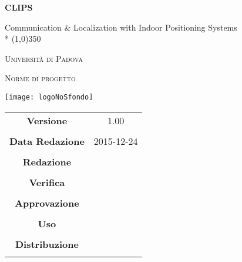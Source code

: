 \documentclass[a4paper,12pt]{article}
\author{Oscar Elia Conti, Marco Zanella}
\date{24/12/2015}
\begin{document}
	\begin{titlepage}
		\centering
		{\huge\bfseries CLIPS\par}
		Communication \& Localization with Indoor Positioning Systems \\*
		\line(1,0){350} \\
		{\scshape\LARGE Università di Padova \par}
		\vspace{1cm}
		{\scshape\Large Norme di progetto\par}
		\vspace{2cm}
		\begin{center}
		{\texttt{[image: logoNoSfondo]} \par}
		\end{center}
		\vfill \vfill
		\begin{tabular}{c|c}
			{\hfill \textbf{Versione}} 			& 1.00				\\ \\
			{\hfill\textbf{Data Redazione}} 		& 2015-12-24  		\\ \\
			{\hfill\textbf{Redazione}} 			&  \\ \\
			{\hfill\textbf{Verifica}} 				&  \\ \\
			{\hfill\textbf{Approvazione}} 		&  \\ \\
			{\hfill\textbf{Uso}} 					& \\ \\
			{\hfill\textbf{Distribuzione}} 			& \\ \\
		\end{tabular}
	\end{titlepage}
	\newpage
	\tableofcontents	
	\label{LastFrontPage}
	\newpage
	\pagestyle{mymain}
         
         	\newpage
		

	\newpage
		
	
	\newpage
		
	
	\newpage
		
		
	\label{LastPage}
\end{document}
